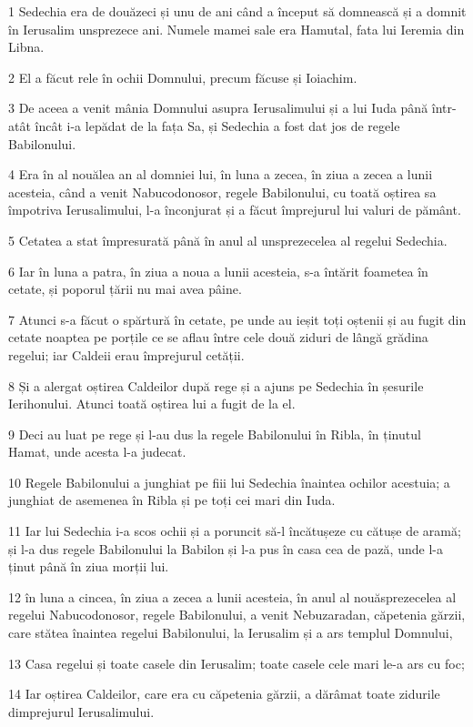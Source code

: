\par 1 Sedechia era de douăzeci și unu de ani când a început să domnească și a domnit în Ierusalim unsprezece ani. Numele mamei sale era Hamutal, fata lui Ieremia din Libna.
\par 2 El a făcut rele în ochii Domnului, precum făcuse și Ioiachim.
\par 3 De aceea a venit mânia Domnului asupra Ierusalimului și a lui Iuda până într-atât încât i-a lepădat de la fața Sa, și Sedechia a fost dat jos de regele Babilonului.
\par 4 Era în al nouălea an al domniei lui, în luna a zecea, în ziua a zecea a lunii acesteia, când a venit Nabucodonosor, regele Babilonului, cu toată oștirea sa împotriva Ierusalimului, l-a înconjurat și a făcut împrejurul lui valuri de pământ.
\par 5 Cetatea a stat împresurată până în anul al unsprezecelea al regelui Sedechia.
\par 6 Iar în luna a patra, în ziua a noua a lunii acesteia, s-a întărit foametea în cetate, și poporul țării nu mai avea pâine.
\par 7 Atunci s-a făcut o spărtură în cetate, pe unde au ieșit toți oștenii și au fugit din cetate noaptea pe porțile ce se aflau între cele două ziduri de lângă grădina regelui; iar Caldeii erau împrejurul cetății.
\par 8 Și a alergat oștirea Caldeilor după rege și a ajuns pe Sedechia în șesurile Ierihonului. Atunci toată oștirea lui a fugit de la el.
\par 9 Deci au luat pe rege și l-au dus la regele Babilonului în Ribla, în ținutul Hamat, unde acesta l-a judecat.
\par 10 Regele Babilonului a junghiat pe fiii lui Sedechia înaintea ochilor acestuia; a junghiat de asemenea în Ribla și pe toți cei mari din Iuda.
\par 11 Iar lui Sedechia i-a scos ochii și a poruncit să-l încătușeze cu cătușe de aramă; și l-a dus regele Babilonului la Babilon și l-a pus în casa cea de pază, unde l-a ținut până în ziua morții lui.
\par 12 în luna a cincea, în ziua a zecea a lunii acesteia, în anul al nouăsprezecelea al regelui Nabucodonosor, regele Babilonului, a venit Nebuzaradan, căpetenia gărzii, care stătea înaintea regelui Babilonului, la Ierusalim și a ars templul Domnului,
\par 13 Casa regelui și toate casele din Ierusalim; toate casele cele mari le-a ars cu foc;
\par 14 Iar oștirea Caldeilor, care era cu căpetenia gărzii, a dărâmat toate zidurile dimprejurul Ierusalimului.
